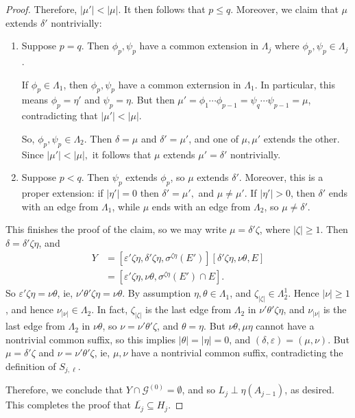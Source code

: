 \documentclass[12pt]{amsart}
\newcommand{\sse}{\subseteq}
\newcommand{\mc}[1]{\mathcal{#1}}
\newcommand{\emp}{\emptyset}
\newcommand{\de}{\delta}
\newcommand{\ep}{\varepsilon}
\newcommand{\ze}{\zeta}
\renewcommand{\th}{\theta}
\newcommand{\La}{\Lambda}
\newcommand{\si}{\sigma}
\theoremstyle{plain} %
\theoremstyle{definition} %
\begin{document}
\begin{proof}
    Therefore, $|\mu'| < |\mu|$. It then follows that $p \le q$. Moreover, we claim that $\mu$ extends $\de'$ nontrivially:


    \begin{enumerate}
        \item[\textbf{Case 1:}] Suppose $p=q$. Then $\phi_p, \psi_p$ have a common extension in $\La_j$ where $\phi_p, \psi_p \in \La_j$. 
    
    If $\phi_p \in \La_1$, then $\phi_p, \psi_p$ have a common externsion in $\La_1$. In particular, this means $\phi_p = \eta'$ and $\psi_p = \eta$. But then $\mu' = \phi_1 \cdots \phi_{p-1} = \psi_q \cdots \psi_{p-1} = \mu$, contradicting that $|\mu'| < |\mu|$.

    So, $\phi_p, \psi_p \in \La_2$. Then $\de = \mu$ and $\de' = \mu'$, and one of $\mu, \mu'$ extends the other. Since $|\mu'| < |\mu|,$ it follows that $\mu$ extends $\mu' = \de'$ nontrivially.

    \item[\textbf{Case 2:}] Suppose $p < q$. Then $\psi_p$ extends $\phi_p$, so $\mu$ extends $\de'$. Moreover, this is a proper extension: if $|\eta'| = 0$ then $\de' = \mu',$ and $\mu \neq \mu'$. If $|\eta'| > 0$, then $\de'$ ends with an edge from $\La_1$, while $\mu$ ends with an edge from $\La_2$, so $\mu \neq \de'$.
    \end{enumerate}
    This finishes the proof of the claim, so we may write $\mu = \de' \ze$, where $|\ze| \ge 1$. Then $\de = \de'\ze \eta$, and
    \begin{align*}
        Y &= [\ep' \ze \eta, \de' \zeta \eta, \si^{\ze \eta}(E')] [\de' \ze \eta, \nu \th, E]\\
        &= [\ep' \ze \eta, \nu \th, \si^{\ze \eta}(E') \cap E].
    \end{align*}
    So $\ep' \ze \eta = \nu \th$, ie, $\nu' \th' \ze \eta = \nu \th$. By assumption $\eta, \th \in \La_1$, and $\ze_{|\ze|} \in \La_2^1$. Hence $|\nu| \ge 1$, and hence $\nu_{|\nu|} \in \La_2$. In fact, $\ze_{|\ze|}$ is the last edge from $\La_2$ in $\nu' \th' \ze \eta$, and $\nu_{|\nu|}$ is the last edge from $\La_2$ in $\nu \th$, so $\nu = \nu' \th' \ze$, and $\th  = \eta$. But $\nu\th, \mu\eta$ cannot have a nontrivial common suffix, so this implies $|\th| = |\eta| = 0$, and $(\de, \ep) = (\mu, \nu)$. But $\mu = \de' \ze$ and $\nu = \nu'\th'\ze$, ie, $\mu,\nu$ have a nontrivial common suffix, contradicting the definition of $S_{j,\ell}$.

    Therefore, we conclude that $Y \cap \mc{G}^{(0)} = \emp$, and so $L_j \perp \eta(A_{j-1})$, as desired. This completes the proof that $\overline{L_j} \sse H_j$.
    

\end{proof}
\end{document}
